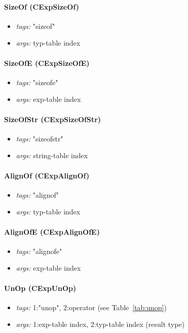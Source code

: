 \documentclass[11pt]{article}
\begin{document}
\paragraph{SizeOf (CExpSizeOf)}
\begin{itemize}
\item \emph{tags:} "sizeof"
\item \emph{args:} typ-table index
\end{itemize}

\paragraph{SizeOfE (CExpSizeOfE)}
\begin{itemize}
\item \emph{tags:} "sizeofe"
\item \emph{args:} exp-table index
\end{itemize}

\paragraph{SizeOfStr (CExpSizeOfStr)}
\begin{itemize}
\item \emph{tags:} "sizeofstr" 
\item \emph{args:} string-table index
\end{itemize}

\paragraph{AlignOf (CExpAlignOf)}
\begin{itemize}
\item \emph{tags:} "alignof"
\item \emph{args:} typ-table index
\end{itemize}

\paragraph{AlignOfE (CExpAlignOfE)}
\begin{itemize}
\item \emph{tags:} "alignofe"
\item \emph{args:} exp-table index
\end{itemize}

\paragraph{UnOp (CExpUnOp)}
\begin{itemize}
\item \emph{tags:} 1:"unop", 2:operator (see Table~\ref{tab:unop})
\item \emph{args:} 1:exp-table index, 2:typ-table index (result type)
\end{itemize}
\end{document}
